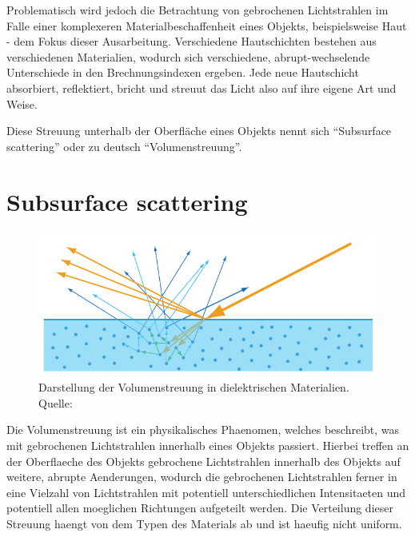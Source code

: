 \documentclass[ngerman,runningheads,a4paper]{llncs}[2018/03/10]
\begin{document}
Problematisch wird jedoch die Betrachtung von gebrochenen Lichtstrahlen im Falle einer komplexeren Materialbeschaffenheit eines Objekts, beispielsweise Haut - dem Fokus dieser Ausarbeitung.
Verschiedene Hautschichten bestehen aus verschiedenen Materialien, wodurch sich verschiedene, abrupt-wechselende Unterschiede in den Brechnungsindexen ergeben.
Jede neue Hautschicht absorbiert, reflektiert, bricht und streuut das Licht also auf ihre eigene Art und Weise.

Diese Streuung unterhalb der Oberfläche eines Objekts nennt sich \enquote{Subsurface scattering} oder zu deutsch \enquote{Volumenstreuung}.

\section{Subsurface scattering}
\label{sec:subsurface}

\begin{figure}[!h]
  \centering
  \includegraphics[scale=0.4,keepaspectratio]{./images/subsurface-scattering-illustration.jpg}
  \caption{Darstellung der Volumenstreuung in dielektrischen Materialien. Quelle: \cite{real-time-rendering}}
  \label{fig:subsurface-scattering}
\end{figure}

Die Volumenstreuung ist ein physikalisches Phaenomen, welches beschreibt, was mit gebrochenen Lichtstrahlen innerhalb eines Objekts passiert.
Hierbei treffen an der Oberflaeche des Objekts gebrochene Lichtstrahlen innerhalb des Objekts auf weitere, abrupte Aenderungen, wodurch die gebrochenen Lichtstrahlen ferner in eine Vielzahl von Lichtstrahlen mit potentiell unterschiedlichen Intensitaeten und potentiell allen moeglichen Richtungen aufgeteilt werden.
Die Verteilung dieser Streuung haengt von dem Typen des Materials ab und ist haeufig nicht uniform.
\end{document}

